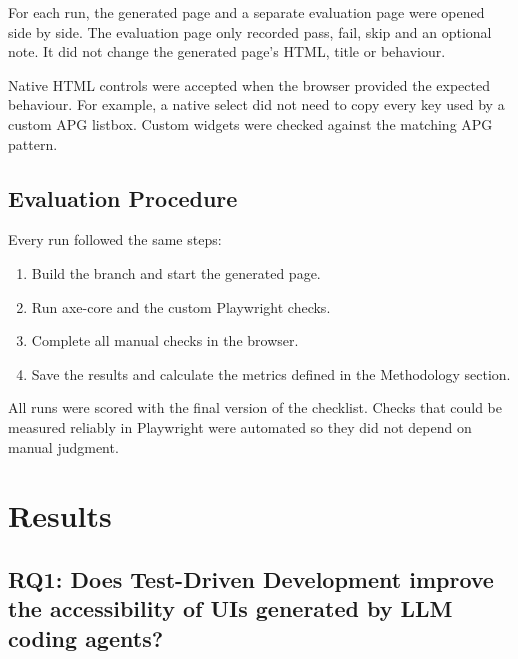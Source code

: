 \documentclass[conference]{IEEEtran}
\begin{document}
For each run, the generated page and a separate evaluation page were opened side by side. The evaluation page only recorded pass, fail, skip and an optional note. It did not change the generated page's HTML, title or behaviour.

Native HTML controls were accepted when the browser provided the expected behaviour. For example, a native select did not need to copy every key used by a custom APG listbox. Custom widgets were checked against the matching APG pattern.

\subsection{Evaluation Procedure}

Every run followed the same steps:
\begin{enumerate}
  \item Build the branch and start the generated page.
  \item Run axe-core and the custom Playwright checks.
  \item Complete all manual checks in the browser.
  \item Save the results and calculate the metrics defined in the Methodology section.
\end{enumerate}

All runs were scored with the final version of the checklist. Checks that could be measured reliably in Playwright were automated so they did not depend on manual judgment.


\section{Results}

\subsection{RQ1: Does Test-Driven Development improve the accessibility of UIs generated by LLM coding agents?}
\end{document}
